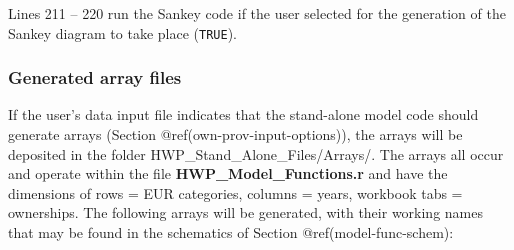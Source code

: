 \documentclass[
  openany]{book}
\begin{document}
Lines 211 -- 220 run the Sankey code if the user selected for the
generation of the Sankey diagram to take place (\texttt{TRUE}).

\hypertarget{dnld-sa-arrays}{%
\subsubsection{Generated array files}\label{dnld-sa-arrays}}

If the user's data input file indicates that the stand-alone model code
should generate arrays (Section @ref(own-prov-input-options)), the
arrays will be deposited in the folder HWP\_Stand\_Alone\_Files/Arrays/.
The arrays all occur and operate within the file
\textbf{HWP\_Model\_Functions.r} and have the dimensions of rows = EUR
categories, columns = years, workbook tabs = ownerships. The following
arrays will be generated, with their working names that may be found in
the schematics of Section @ref(model-func-schem):
\end{document}
